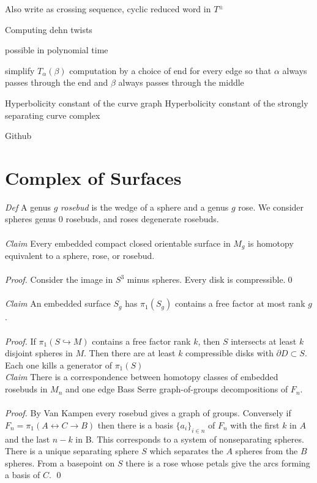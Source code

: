 \documentclass[11pt]{article}
\theoremstyle{remark}
\theoremstyle{definition}
\begin{document}
Also write as crossing sequence, cyclic reduced word in $T^{\pm}$

Computing dehn twists

possible in polynomial time

simplify  $T_\alpha(\beta)$ computation by a choice
of end for every edge so that $\alpha$ always passes through the end
and $\beta$ always passes through the middle

Hyperbolicity constant of the curve graph
Hyperbolicity constant of the strongly separating curve complex

Github

\section{Complex of Surfaces}

\noindent \emph{Def}
A genus $g$ \emph{rosebud} is the wedge of a sphere and a genus $g$ rose.
We consider spheres genus 0 rosebuds, and roses degenerate rosebuds.\\
\\

\noindent \emph{Claim}
Every embedded compact
closed orientable surface in $M_g$
is homotopy equivalent to a sphere, rose, or rosebud.\\
\\
\emph{Proof.}
Consider the image in $S^3$ minus spheres.
Every disk is compressible.\qed\\
\\

\noindent \emph{Claim}
An embedded surface $S_g$ has $\pi_1(S_g)$ contains a
free factor at most rank $g$.\\
\\
\emph{Proof.}
If $\pi_1(S \hookrightarrow M)$ contains a free factor rank $k$,
then $S$ intersects at least $k$ disjoint spheres
in $M$. Then there are at least $k$
compressible disks with $\partial D \subset S$.
Each one kills a generator of $\pi_1(S)$
\\

\noindent \emph{Claim}
There is a correspondence between
homotopy classes of embedded rosebuds
in $M_n$ and one edge Bass Serre graph-of-groups
decompositions of $F_n$.\\
\\
\emph{Proof.}
By Van Kampen every rosebud gives a graph of groups.
Conversely if $F_n =  \pi_1 ( A \leftrightarrow C \rightarrow B )$
then there is a basis $\{a_i\}_{i \in n}$ of $F_n$
with the first $k$ in $A$ and the last $n-k$ in B.
This corresponds to a system of nonseparating spheres.
There is a unique separating sphere $S$ which separates the $A$
spheres from the $B$ spheres.
From a basepoint on $S$ there is a rose whose petals give the arcs forming
a basis of $C$. \qed\\
\\
\end{document}
